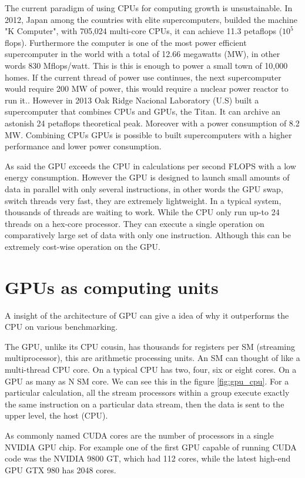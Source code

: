 The current paradigm of using CPUs for computing growth is unsustainable. In 2012, Japan among the countries with elite supercomputers, builded the machine "K Computer", with 705,024 multi-core CPUs, it can achieve 11.3 petaflops ($10^5$ flops). Furthermore the computer is one of the most power efficient supercomputer in the world with a total of 12.66 megawatts (MW), in other words 830 Mflops/watt. This is this is enough to power a small town of 10,000 homes. If the current thread of power use continues, the next supercomputer would require 200 MW of power, this would require a nuclear power reactor to run it.\cite{whatexascale}. However in 2013 Oak Ridge Nacional Laboratory (U.S) built a supercomputer that combines CPUs and GPUs, the Titan. It can archive an astonish 24 petaflops theoretical peak. Moreover with a power consumption of 8.2 MW. Combining CPUs GPUs is possible to built supercomputers with a higher performance and lower power consumption. \cite{titan}


As said the GPU exceeds the CPU in calculations per second FLOPS with a low energy consumption. However the GPU is designed to launch small amounts of data in parallel with only several instructions, in other words the GPU swap, switch threads very fast, they are extremely lightweight. In a typical system, thousands of threads are waiting to work. While the CPU only run up-to 24 threads on a hex-core processor. They can execute a single operation on comparatively large set of data with only one instruction. Although this can be extremely cost-wise operation on the GPU.

\section{GPUs as computing units}

A insight of the architecture of GPU can give a idea of  why it outperforms the CPU on various benchmarking.

The GPU, unlike its CPU cousin, has thousands for registers per SM (streaming multiprocessor), this are  arithmetic processing units. An SM can thought of like a multi-thread CPU core. On a typical CPU has two, four, six or eight cores. On a GPU as many as N SM core. We can see this in the figure \ref{fig:gpu_cpu}. For a particular calculation, all the stream
processors within a group execute exactly the same instruction on a particular data stream, then the data is sent to the upper level, the host (CPU). \cite{cook}

As commonly named CUDA cores are the number of processors in a single NVIDIA GPU chip. For example one of the first GPU capable of running CUDA code was the NVIDIA 9800 GT, which had 112 cores, while the latest high-end GPU GTX 980 has 2048 cores.

